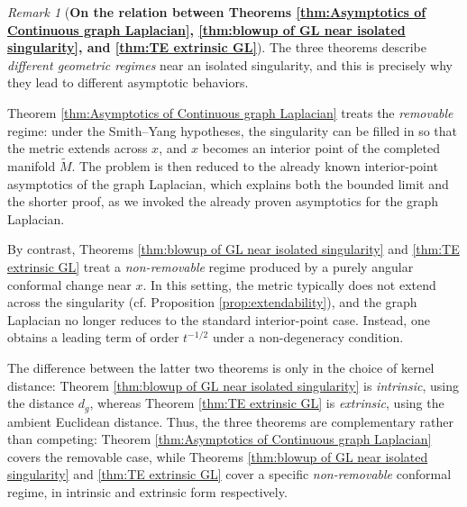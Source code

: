 \documentclass{amsart}
\theoremstyle{definition}
\theoremstyle{remark}
\newtheorem{remark}[theorem]{Remark}
\newcommand{\0}{\boldsymbol{0}}
\begin{document}
\begin{remark}[\textbf{On the relation between Theorems \ref{thm:Asymptotics of Continuous graph Laplacian}, \ref{thm:blowup of GL near isolated singularity}, and \ref{thm:TE extrinsic GL}}]
The three theorems describe \emph{different geometric regimes} near an isolated singularity, and this is precisely why they lead to different asymptotic behaviors.

Theorem \ref{thm:Asymptotics of Continuous graph Laplacian} treats the \emph{removable} regime: under the Smith--Yang hypotheses, the singularity can be filled in so that the metric extends across $x$, and $x$ becomes an interior point of the completed manifold $\widetilde M$. The problem is then reduced to the already known interior-point asymptotics of the graph Laplacian, which explains both the bounded limit and the shorter proof, as we invoked the already proven asymptotics for the graph Laplacian.

By contrast, Theorems \ref{thm:blowup of GL near isolated singularity} and \ref{thm:TE extrinsic GL} treat a \emph{non-removable} regime produced by a purely angular conformal change near $x$. In this setting, the metric typically does not extend across the singularity (cf. Proposition \ref{prop:extendability}), and the graph Laplacian no longer reduces to the standard interior-point case. Instead, one obtains a leading term of order $t^{-1/2}$ under a non-degeneracy condition.

The difference between the latter two theorems is only in the choice of kernel distance: Theorem \ref{thm:blowup of GL near isolated singularity} is \emph{intrinsic}, using the distance $d_g$, whereas Theorem \ref{thm:TE extrinsic GL} is \emph{extrinsic}, using the ambient Euclidean distance. Thus, the three theorems are complementary rather than competing: Theorem \ref{thm:Asymptotics of Continuous graph Laplacian} covers the removable case, while Theorems \ref{thm:blowup of GL near isolated singularity} and \ref{thm:TE extrinsic GL} cover a specific \textit{non-removable} conformal regime, in intrinsic and extrinsic form respectively.
\end{remark}

\end{document}
